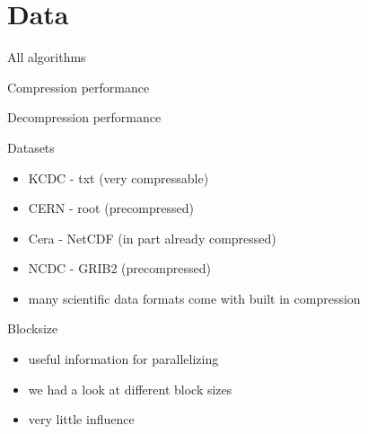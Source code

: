 \documentclass[10pt, compress]{beamer}
\begin{document}
\section{Data}
\begin{frame}{All algorithms}
    \begin{figure}[h]
        \begin{center}
            \scalebox{0.5}{}
        \end{center}
    \end{figure}
\end{frame}

\begin{frame}{Compression performance}
    \begin{figure}[h]
        \begin{center}
            \scalebox{0.5}{}
        \end{center}
    \end{figure}
\end{frame}

\begin{frame}{Decompression performance}
    \begin{figure}[h]
        \begin{center}
            \scalebox{0.5}{}
        \end{center}
    \end{figure}
\end{frame}

\begin{frame}{Datasets}
    \begin{itemize}
        \item KCDC - txt (very compressable)
        \item CERN - root (precompressed)
        \item Cera - NetCDF (in part already compressed)
        \item NCDC - GRIB2 (precompressed)
        \item \textrightarrow many scientific data formats come with built in compression
    \end{itemize}
\end{frame}

\begin{frame}{Blocksize}
    \begin{itemize}
        \item useful information for parallelizing
        \item we had a look at different block sizes
        \item very little influence
    \end{itemize}
    \vspace{-0.8em}
    \begin{figure}[h]
        \begin{center}
            \scalebox{0.42}{}
        \end{center}
    \end{figure}
\end{frame}
\end{document}
